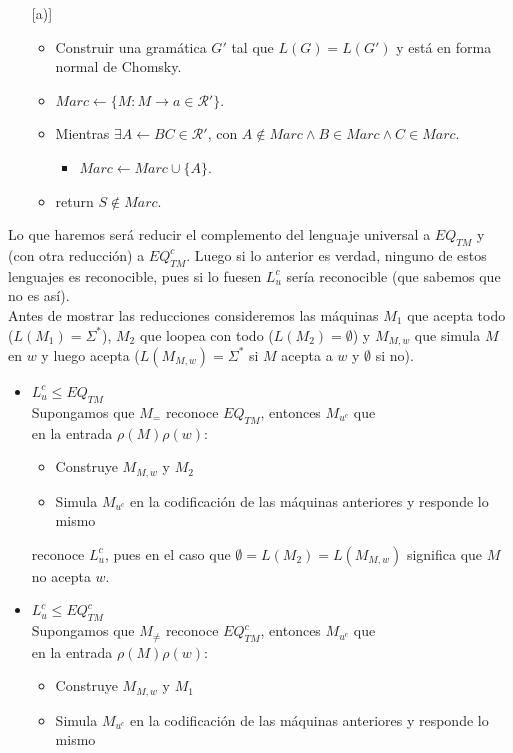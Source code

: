 \documentclass[dcc]{fcfmcourse}
\begin{document}
\begin{problems}
\begin{enumerate} [a)]
 \begin{itemize}
 \item Construir una gramática $G'$ tal que $L(G) = L(G')$ y está en forma normal de Chomsky.
 \item $Marc\leftarrow \{M \colon M \rightarrow a \in \mathcal{R}'\}$.
 \item Mientras $\exists A \leftarrow BC \in \mathcal{R}'$, con $A\not \in Marc \land B\in Marc \land C \in Marc$.
 \begin{itemize}
 \item $Marc \leftarrow Marc \cup \{A\}$.
 \end{itemize}
 \item return $S\not\in Marc$.
 \end{itemize}
 \end{enumerate}
 \problem Lo que haremos será reducir el complemento del lenguaje universal a $EQ_{TM}$ y (con otra reducción) a $EQ_{TM}^c$. Luego si lo anterior es verdad, ninguno de estos lenguajes es reconocible, pues si lo fuesen $L_{u}^c$ sería reconocible (que sabemos que no es así).\\ Antes de mostrar las reducciones consideremos las máquinas $M_{1}$ que acepta todo ($L(M_{1}) = \Sigma^*$), $M_{2}$ que loopea con todo ($L(M_{2}) = \emptyset$) y $M_{M,w}$ que simula $M$ en $w$ y luego acepta ($L(M_{M,w}) = \Sigma^*$ si $M$ acepta a $w$ y $\emptyset$ si no).
 \begin{itemize}
 \item $L_{u}^c \le EQ_{TM}$\\
 Supongamos que $M_{=}$ reconoce $EQ_{TM}$, entonces $M_{u^c}$ que\\
 en la entrada $\rho(M)\rho(w)$:
 \begin{itemize}
     \item Construye $M_{M,w}$ y $M_{2}$
     \item Simula $M_{u^c}$ en la codificación de las máquinas anteriores y responde lo mismo
 \end{itemize}
 reconoce $L_{u}^c$, pues en el caso que $\emptyset = L(M_{2}) = L(M_{M,w})$ significa que $M$ no acepta $w$.
  \item $L_{u}^c \le EQ_{TM}^c$\\
 Supongamos que $M_{\not=}$ reconoce $EQ_{TM}^c$, entonces $M_{u^c}$ que\\
 en la entrada $\rho(M)\rho(w)$:
 \begin{itemize}
     \item Construye $M_{M,w}$ y $M_{1}$
     \item Simula $M_{u^c}$ en la codificación de las máquinas anteriores y responde lo mismo

\end{itemize}
\end{itemize}
\end{problems}
\end{document}
